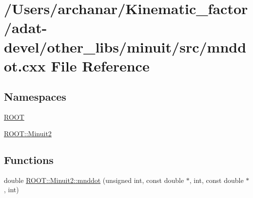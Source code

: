 \hypertarget{adat-devel_2other__libs_2minuit_2src_2mnddot_8cxx}{}\section{/\+Users/archanar/\+Kinematic\+\_\+factor/adat-\/devel/other\+\_\+libs/minuit/src/mnddot.cxx File Reference}
\label{adat-devel_2other__libs_2minuit_2src_2mnddot_8cxx}
\subsection*{Namespaces}
\begin{DoxyCompactItemize}
\item 
 \mbox{\hyperlink{namespaceROOT}{R\+O\+OT}}
\item 
 \mbox{\hyperlink{namespaceROOT_1_1Minuit2}{R\+O\+O\+T\+::\+Minuit2}}
\end{DoxyCompactItemize}
\subsection*{Functions}
\begin{DoxyCompactItemize}
\item 
double \mbox{\hyperlink{namespaceROOT_1_1Minuit2_a2226faf256d69bf5b922caad1380c34e}{R\+O\+O\+T\+::\+Minuit2\+::mnddot}} (unsigned int, const double $\ast$, int, const double $\ast$, int)
\end{DoxyCompactItemize}
